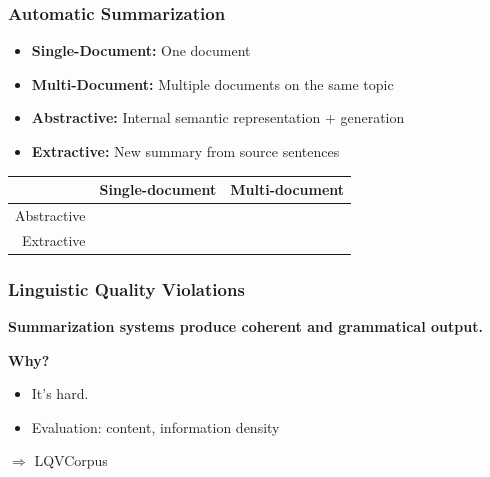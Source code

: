\documentclass[table]{beamer}
\begin{document}
\begin{frame}
  \frametitle{Automatic Summarization}
  \begin{itemize}
    \item \textbf{Single-Document:} One document
    \item \textbf{Multi-Document:} Multiple documents on the same topic
  \end{itemize}
  \pause
  \begin{itemize}
    \item \textbf{Abstractive:} Internal semantic representation + generation
    \item \textbf{Extractive:} New summary from source sentences
  \end{itemize}
  \pause
  \vspace{1cm}

  \quad \quad \quad \begin{tabular}{r|c|c|}
    & Single-document & Multi-document\\
    \hline
    Abstractive & \cellcolor{red!25} & \cellcolor{red!25}\\
    \hline
    Extractive & \cellcolor{red!25} & \cellcolor{green!25}\\
    \hline
  \end{tabular}
\end{frame}

\begin{frame}
  \frametitle{Linguistic Quality Violations}
  \textbf{Summarization systems  produce coherent and grammatical output.}
  \pause

  \textbf{Why?}
  \begin{itemize}
    \item It's hard.\pause
    \item Evaluation: content, information density
  \end{itemize}
  \vspace{1cm}
  \pause
  $\Rightarrow$ LQVCorpus \citep{friedrichlqvsumm}


\end{frame}
\end{document}
